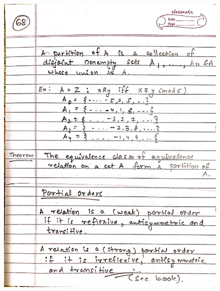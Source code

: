 \begin{figure}[H]
    \centering
    \includegraphics[width=16cm, height=21cm]{"./MIT-6.042J/MIT-6042J-068"}
\end{figure}
\newpage

